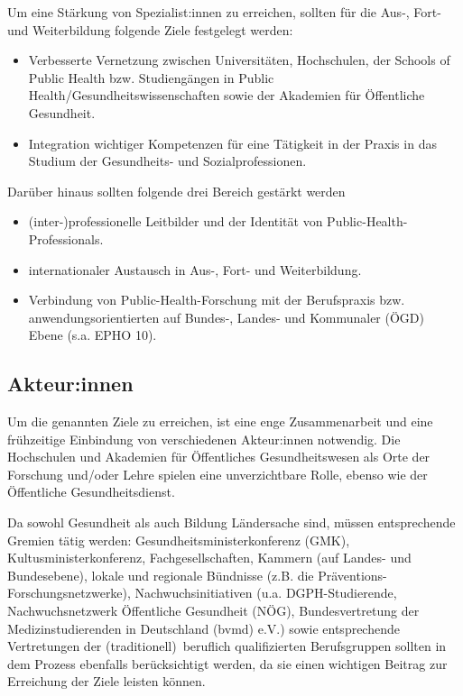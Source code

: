\documentclass{article}
\begin{document}
Um eine Stärkung von Spezialist:innen zu erreichen, sollten für die Aus-, Fort- und Weiterbildung folgende Ziele festgelegt werden: 

\begin{itemize}
\item Verbesserte Vernetzung zwischen Universitäten, Hochschulen, der Schools of Public Health bzw. Studiengängen in Public Health/Gesundheitswissenschaften sowie der Akademien für Öffentliche Gesundheit.


\item Integration wichtiger Kompetenzen für eine Tätigkeit in der Praxis in das Studium der Gesundheits- und Sozialprofessionen.


\end{itemize}

Darüber hinaus sollten folgende drei Bereich gestärkt werden

\begin{itemize}
\item (inter-)professionelle Leitbilder und der Identität von Public-Health-Professionals.


\item internationaler Austausch in Aus-, Fort- und Weiterbildung. 


\item Verbindung von Public-Health-Forschung mit der Berufspraxis bzw. anwendungsorientierten auf Bundes-, Landes- und Kommunaler (ÖGD) Ebene (s.a. EPHO 10).


\end{itemize}

\subsection{Akteur:innen}\label{H4085476}



Um die genannten Ziele zu erreichen, ist eine enge Zusammenarbeit und eine frühzeitige Einbindung von verschiedenen Akteur:innen notwendig. Die Hochschulen und Akademien für Öffentliches Gesundheitswesen als Orte der Forschung und/oder Lehre spielen eine unverzichtbare Rolle, ebenso wie der Öffentliche Gesundheitsdienst. 


Da sowohl Gesundheit als auch Bildung Ländersache sind, müssen entsprechende Gremien tätig werden: Gesundheitsministerkonferenz (GMK), Kultusministerkonferenz, Fachgesellschaften, Kammern (auf Landes- und Bundesebene), lokale und regionale Bündnisse (z.B. die Präventions-Forschungsnetzwerke), Nachwuchsinitiativen (u.a. DGPH-Studierende, Nachwuchsnetzwerk Öffentliche Gesundheit (NÖG), Bundesvertretung der Medizinstudierenden in Deutschland (bvmd) e.V.) sowie entsprechende Vertretungen der (traditionell) beruflich qualifizierten Berufsgruppen sollten in dem Prozess ebenfalls berücksichtigt werden, da sie einen wichtigen Beitrag zur Erreichung der Ziele leisten können.
\end{document}
